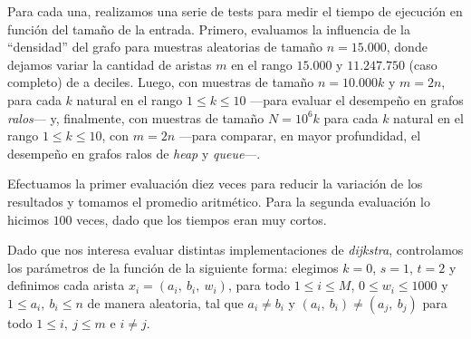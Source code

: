 Para cada una, realizamos una serie de tests para medir el tiempo de ejecución en función del tamaño de la entrada. Primero, evaluamos la influencia de la ``densidad'' del grafo para muestras aleatorias de tamaño $n = 15.000$, donde dejamos variar la cantidad de aristas $m$ en el rango $15.000$ y $11.247.750$ (caso completo) de a deciles. Luego, con muestras de tamaño $n = 10.000k$ y $m = 2n$, para cada $k$ natural en el rango $1 \leq k \leq 10$ ---para evaluar el desempeño en grafos \textit{ralos}--- y, finalmente, con muestras de tamaño $N = 10^6k$ para cada $k$ natural en el rango $1 \leq k \leq 10$, con $m = 2n$ ---para comparar, en mayor profundidad, el desempeño en grafos ralos de \textit{heap} y \textit{queue}---.


Efectuamos la primer evaluación diez veces para reducir la variación de los resultados y tomamos el promedio aritmético. Para la segunda evaluación lo hicimos $100$ veces, dado que los tiempos eran muy cortos.

Dado que nos interesa evaluar distintas implementaciones de \textit{dijkstra}, controlamos los parámetros de la función de la siguiente forma: elegimos $k = 0$, $s = 1$, $t = 2$ y definimos cada arista $x_i = (a_i,\ b_i,\ w_i)$, para todo $1 \leq  i \leq M$, $0 \leq w_i \leq 1000$ y $1 \leq a_i,\ b_i \leq n$ de manera aleatoria, tal que $a_i \neq b_i$ y $(a_i,\ b_i) \neq (a_j,\ b_j)$ para todo $1 \leq i,\ j \leq m$ e $i \neq j$.


